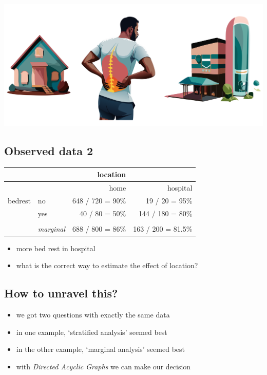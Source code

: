 \documentclass[
  letterpaper,
  DIV=11,
  numbers=noendperiod]{scrartcl}
\providecommand{\tightlist}{%
  \setlength{\itemsep}{0pt}\setlength{\parskip}{0pt}}\usepackage{longtable,booktabs,array}
\begin{document}
\includegraphics{figs/delivery-backpain.png}

\subsection{Observed data 2}\label{observed-data-2}

\begin{longtable}[]{@{}llrr@{}}
\toprule\noalign{}
& & location & \\
\midrule\noalign{}
\endhead
\bottomrule\noalign{}
\endlastfoot
& & home & hospital \\
bedrest & no & 648 / 720 = 90\% & 19 / 20 = 95\% \\
& yes & 40 / 80 = 50\% & 144 / 180 = 80\% \\
& & & \\
& \emph{marginal} & 688 / 800 = 86\% & 163 / 200 = 81.5\% \\
\end{longtable}

\begin{itemize}
\tightlist
\item
  more bed rest in hospital
\item
  what is the correct way to estimate the effect of location?
\end{itemize}

\subsection{How to unravel this?}\label{how-to-unravel-this}

\begin{itemize}
\tightlist
\item
  we got two questions with exactly the same data
\item
  in one example, `stratified analysis' seemed best
\item
  in the other example, `marginal analysis' seemed best
\item
  with \emph{Directed Acyclic Graphs} we can make our decision
\end{itemize}
\end{document}

